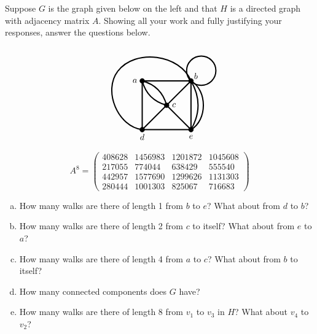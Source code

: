 \documentclass[11pt,letterpaper]{article}
\begin{document}
 Suppose $G$ is the graph given below on the left and that $H$ is a directed graph with adjacency matrix $A$. Showing all your work and fully justifying your responses, answer the questions below. \par
	\begin{minipage}[c]{0.49\textwidth}
	\[
	\begin{tikzpicture}[scale=2]
	\draw[line width=0.05cm] (0,0) to (1,0);
	\draw[line width=0.05cm] (0,0) to (0,1);
	\draw[line width=0.05cm] (0,1) to (1,1);
	\draw[line width=0.05cm] (1,0) to (1,1);
	\draw[line width=0.05cm] (0,0) to (1,1);
	\draw[line width=0.05cm] (0.5,0.5) to (1,0);
	\draw[line width=0.05cm, bend right= 30] (0,1) to (0.5,0.5);
	\draw[line width=0.05cm, bend left= 30] (0,1) to (0.5,0.5);
	\draw[line width=0.05cm, bend right= 30] (1,0) to (1,1);
	\draw[line width=0.05cm, bend right= 60] (1,0) to (1,1);
	\draw[line width=0.05cm, bend left= 60] (0,0) to (-0.5,1.2);
	\draw[line width=0.05cm, bend right= 60] (1,1) to (-0.5,1.2);
	\draw[line width=0.05cm] (1.21,1.21) circle (0.3);
	
	\draw[fill= black] (0,0) circle (0.05);
	\draw[fill= black] (1,0) circle (0.05);
	\draw[fill= black] (1,1) circle (0.05);
	\draw[fill= black] (0,1) circle (0.05);
	\draw[fill= black] (0.5,0.5) circle (0.05);
	
	\node at (-0.15,1) {$a$};
	\node at (1.10,1.10) {$b$};
	\node at (0.65,0.50) {$c$};
	\node at (0,-0.15) {$d$};
	\node at (1,-0.15) {$e$};
	\end{tikzpicture}
	\]
	\end{minipage}%
	\begin{minipage}[c]{0.49\textwidth}
	\[
	A^8= 
	\begin{pmatrix}
	408 628 & 1456983 & 1201872 & 1045608 \\
	217055 & 774044 & 638429 & 555540 \\
	442957 & 1577690 & 1299626 & 1131303 \\
	280444 & 1001303 & 825067 & 716683
	\end{pmatrix}
	\]
	\end{minipage}

\begin{enumerate}[(a)]
\item How many walks are there of length 1 from $b$ to $e$? What about from $d$ to $b$?
\item How many walks are there of length 2 from $c$ to itself? What about from $e$ to $a$?
\item How many walks are there of length 4 from $a$ to $c$? What about from $b$ to itself?
\item How many connected components does $G$ have?
\item How many walks are there of length 8 from $v_1$ to $v_3$ in $H$? What about $v_4$ to $v_2$?
\end{enumerate}
\end{document}

